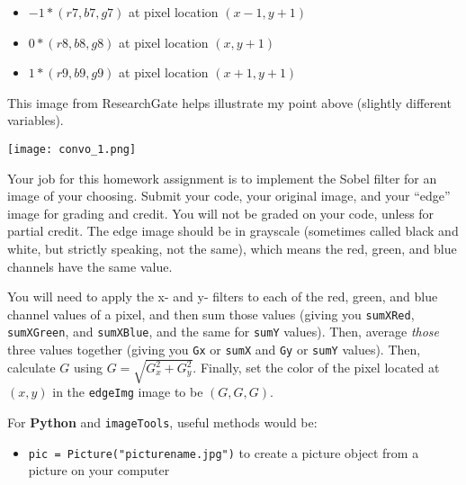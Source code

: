 \documentclass{article}
\begin{document}
\begin{itemize}
\begin{itemize}
\begin{itemize}
                        \item $-1 * (r7, b7, g7)$ at pixel location $(x-1, y+1)$

                        \item $0 * (r8, b8, g8)$ at pixel location $(x, y+1)$

                        \item $1 * (r9, b9, g9)$ at pixel location $(x+1, y+1)$

                    \end{itemize}

                    This image from ResearchGate helps illustrate my point above (slightly different variables).

                    \begin{center}
                        \texttt{[image: convo\_1.png]}
                    \end{center}



          \end{itemize}


          Your job for this homework assignment is to implement the Sobel filter for an image of your choosing.  Submit your code, your original image, and your ``edge” image for grading and credit. You will not be graded on your code, unless for partial credit. The edge image should be in grayscale (sometimes called black and white, but strictly speaking, not the same), which means the red, green, and blue channels have the same value.

          You will need to apply the x- and y- filters to each of the red, green, and blue channel values of a pixel, and then sum those values (giving you \texttt{sumXRed}, \texttt{sumXGreen}, and \texttt{sumXBlue}, and the same for \texttt{sumY} values).  Then, average \emph{those} three values together (giving you \texttt{Gx} or \texttt{sumX} and \texttt{Gy} or \texttt{sumY} values).  Then, calculate $G$ using $G = \sqrt{G_x^2 + G_y^2}$.  Finally, set the color of the pixel located at $(x, y)$ in the \texttt{edgeImg} image to be $(G, G, G)$.

          \hrulefill
          \vspace{5mm}

          For \textbf{Python} and \texttt{imageTools}, useful methods would be:

          \begin{itemize}

              \item \texttt{pic = Picture("picturename.jpg")} to create a picture object from a picture on your computer


\end{itemize}
\end{itemize}
\end{document}
